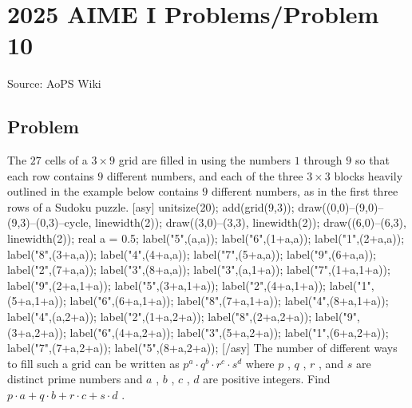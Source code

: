 \documentclass[12pt]{article}
\begin{document}
\section*{{2025 AIME I Problems/Problem 10}}
Source: AoPS Wiki

\subsection*{Problem}
The $27$ cells of a $3 \times 9$ grid are filled in using the numbers $1$ through $9$ so that each row contains $9$ different numbers, and each of the three $3 \times 3$ blocks heavily outlined in the example below contains $9$ different numbers, as in the first three rows of a Sudoku puzzle. [asy] unitsize(20); add(grid(9,3)); draw((0,0)--(9,0)--(9,3)--(0,3)--cycle, linewidth(2)); draw((3,0)--(3,3), linewidth(2)); draw((6,0)--(6,3), linewidth(2)); real a = 0.5; label("5",(a,a)); label("6",(1+a,a)); label("1",(2+a,a)); label("8",(3+a,a)); label("4",(4+a,a)); label("7",(5+a,a)); label("9",(6+a,a)); label("2",(7+a,a)); label("3",(8+a,a)); label("3",(a,1+a)); label("7",(1+a,1+a)); label("9",(2+a,1+a)); label("5",(3+a,1+a)); label("2",(4+a,1+a)); label("1",(5+a,1+a)); label("6",(6+a,1+a)); label("8",(7+a,1+a)); label("4",(8+a,1+a)); label("4",(a,2+a)); label("2",(1+a,2+a)); label("8",(2+a,2+a)); label("9",(3+a,2+a)); label("6",(4+a,2+a)); label("3",(5+a,2+a)); label("1",(6+a,2+a)); label("7",(7+a,2+a)); label("5",(8+a,2+a)); [/asy] The number of different ways to fill such a grid can be written as $p^a \cdot q^b \cdot r^c \cdot s^d$ where $p$ , $q$ , $r$ , and $s$ are distinct prime numbers and $a$ , $b$ , $c$ , $d$ are positive integers. Find $p \cdot a + q \cdot b + r \cdot c + s \cdot d$ .
\end{document}
